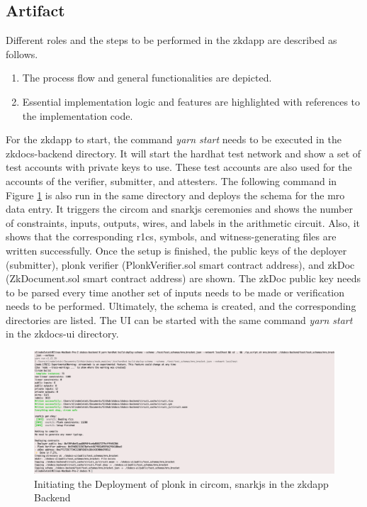 \subsection{Artifact}
Different roles and the steps to be performed in the \acrshort{zkdapp} are described as follows.
\begin{enumerate}
\item The process flow and general functionalities are depicted.
\item Essential implementation logic and features are highlighted with references to the implementation code.
\end{enumerate}
For the \acrshort{zkdapp} to start, the command \textit{yarn start} needs to be executed in the zkdocs-backend directory. It will start the hardhat test network and show a set of test accounts with private keys to use. These test accounts are also used for the accounts of the verifier, submitter, and attesters. The following command in Figure \ref{fig:second-cmd} is also run in the same directory and deploys the schema for the \acrshort{mro} data entry. It triggers the circom and snarkjs ceremonies and shows the number of constraints, inputs, outputs, wires, and labels in the arithmetic circuit. Also, it shows that the corresponding \acrshort{r1cs}, symbols, and witness-generating files are written successfully. Once the setup is finished, the public keys of the deployer (submitter), \acrshort{plonk} verifier (PlonkVerifier.sol smart contract address), and zkDoc (ZkDocument.sol smart contract address) are shown. The zkDoc public key needs to be parsed every time another set of inputs needs to be made or verification needs to be performed. Ultimately, the schema is created, and the corresponding directories are listed. The UI can be started with the same command \textit{yarn start} in the zkdocs-ui directory.

\begin{figure}[hbt]
	\centering
		\includegraphics[width=1.0\textwidth]{Pictures/second-cmd.png}
	\caption{Initiating the Deployment of \acrshort{plonk} in circom, snarkjs in the \acrshort{zkdapp} Backend}
	\label{fig:second-cmd}
\end{figure}

